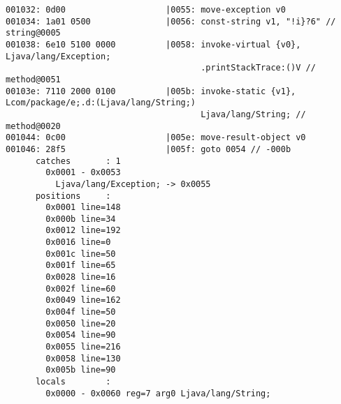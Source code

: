 \begin{lstlisting}
001032: 0d00                    |0055: move-exception v0
001034: 1a01 0500               |0056: const-string v1, "!i}?6" // string@0005
001038: 6e10 5100 0000          |0058: invoke-virtual {v0}, Ljava/lang/Exception;
                                       .printStackTrace:()V // method@0051
00103e: 7110 2000 0100          |005b: invoke-static {v1}, Lcom/package/e;.d:(Ljava/lang/String;)
                                       Ljava/lang/String; // method@0020
001044: 0c00                    |005e: move-result-object v0
001046: 28f5                    |005f: goto 0054 // -000b
      catches       : 1
        0x0001 - 0x0053
          Ljava/lang/Exception; -> 0x0055
      positions     :
        0x0001 line=148
        0x000b line=34
        0x0012 line=192
        0x0016 line=0
        0x001c line=50
        0x001f line=65
        0x0028 line=16
        0x002f line=60
        0x0049 line=162
        0x004f line=50
        0x0050 line=20
        0x0054 line=90
        0x0055 line=216
        0x0058 line=130
        0x005b line=90
      locals        :
        0x0000 - 0x0060 reg=7 arg0 Ljava/lang/String;


\end{lstlisting}
